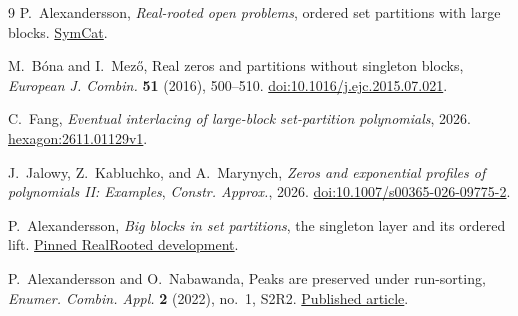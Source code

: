 \documentclass[11pt]{article}
\begin{document}
\begin{thebibliography}{9}
P.~Alexandersson, \emph{Real-rooted open problems}, ordered set partitions with large blocks.
\href{https://www.symmetricfunctions.com/realRootedOpenProblems.htm\#set-partitions-and-trees}{SymCat}.

M.~B\'ona and I.~Mez\H{o}, Real zeros and partitions without singleton blocks,
\emph{European J. Combin.} \textbf{51} (2016), 500--510.
\href{https://doi.org/10.1016/j.ejc.2015.07.021}{doi:10.1016/j.ejc.2015.07.021}.

C.~Fang, \emph{Eventual interlacing of large-block set-partition polynomials}, 2026.
\href{https://hexagonmath.org/2611.01129v1}{hexagon:2611.01129v1}.

J.~Jalowy, Z.~Kabluchko, and A.~Marynych,
\emph{Zeros and exponential profiles of polynomials II: Examples},
\emph{Constr. Approx.}, 2026.
\href{https://doi.org/10.1007/s00365-026-09775-2}{doi:10.1007/s00365-026-09775-2}.

P.~Alexandersson, \emph{Big blocks in set partitions}, the singleton layer and its ordered lift.
\href{https://github.com/PerAlexandersson/RealRooted/blob/d34c13585e69912d443ecb973d9b78733dd9a052/RealRooted/CombinatorialExamples/BigBlockSingletons.lean}{Pinned RealRooted development}.

P.~Alexandersson and O.~Nabawanda, Peaks are preserved under run-sorting,
\emph{Enumer. Combin. Appl.} \textbf{2} (2022), no.~1, S2R2.
\href{https://ecajournal.haifa.ac.il/Volume2022/ECA2022_S2A2.pdf}{Published article}.
\end{thebibliography}
\end{document}
